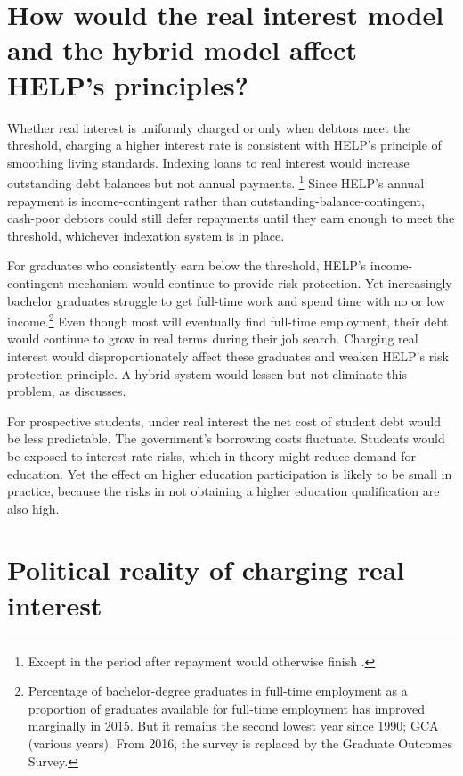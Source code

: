 \documentclass[embargoed]{grattan}
\begin{document}
{\section[How would the real interest model and the hybrid model affect {HELP}'s principles?]{How would the real interest model and the hybrid model affect \gls{HELP}'s principles?}\label{how-would-the-real-interest-model-and-the-hybrid-model-affect-helps-principles}

Whether real interest is uniformly charged or only when debtors meet the threshold, charging a higher interest rate is consistent with \gls{HELP}'s principle of smoothing living standards.
Indexing loans to real interest would increase outstanding debt balances but not annual payments.%
\footnote{Except in the period after repayment would otherwise finish .} Since \gls{HELP}'s annual repayment is income-contingent rather than outstanding-balance-contingent, cash-poor debtors could still defer repayments until they earn enough to meet the threshold, whichever indexation system is in place.

For graduates who consistently earn below the threshold, \gls{HELP}'s income-contingent mechanism would continue to provide risk protection.
Yet increasingly bachelor graduates struggle to get full-time work and spend time with no or low income.\footnote{Percentage of bachelor-degree graduates in full-time employment as a proportion of graduates available for full-time employment has improved marginally in 2015.
But it remains the second lowest year since 1990; GCA (various years).
From 2016, the survey is replaced by the Graduate Outcomes Survey.} Even though most will eventually find full-time employment, their debt would continue to grow in real terms during their job search.
Charging real interest would disproportionately affect these graduates and weaken \gls{HELP}'s risk protection principle.
A hybrid system would lessen but not eliminate this problem, as  discusses.

For prospective students, under real interest the net cost of student debt would be less predictable.
The government's borrowing costs fluctuate.
Students would be exposed to interest rate risks, which in theory might reduce demand for education.
Yet the effect on higher education participation is likely to be small in practice, because the risks in not obtaining a higher education qualification are also high.

\section{Political reality of charging real interest}\label{political-reality-of-charging-real-interest}

}
\end{document}
